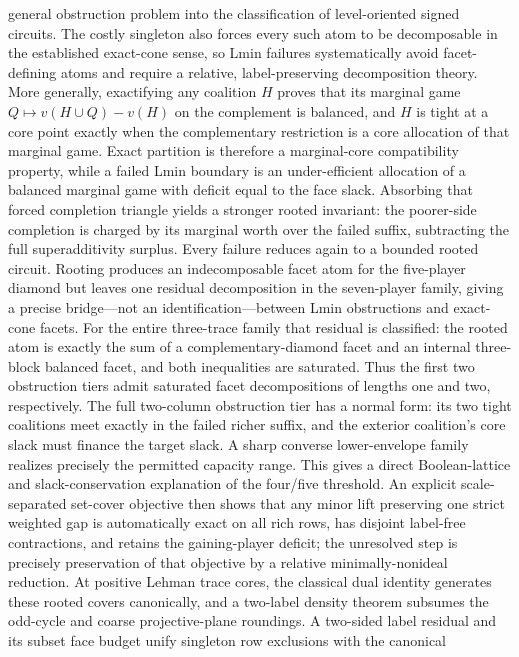 \documentclass[11pt]{article}
\begin{document}
{general obstruction problem into the classification of level-oriented signed
circuits.  The costly singleton also forces every such atom to be decomposable
in the established exact-cone sense, so Lmin failures systematically avoid
facet-defining atoms and require a relative, label-preserving decomposition
theory.
More generally, exactifying any coalition $H$ proves that its marginal game
$Q\mapsto v(H\cup Q)-v(H)$ on the complement is balanced, and $H$ is tight
at a core point exactly when the complementary restriction is a core
allocation of that marginal game.  Exact partition is therefore a
marginal-core compatibility property, while a failed Lmin boundary is an
under-efficient allocation of a balanced marginal game with deficit equal to
the face slack.
Absorbing that forced completion triangle yields a stronger rooted invariant:
the poorer-side completion is charged by its marginal worth over the failed
suffix, subtracting the full superadditivity surplus.  Every failure reduces
again to a bounded rooted circuit.  Rooting produces an indecomposable facet
atom for the five-player diamond but leaves one residual decomposition in the
seven-player family, giving a precise bridge---not an identification---between
Lmin obstructions and exact-cone facets.
For the entire three-trace family that residual is classified: the rooted
atom is exactly the sum of a complementary-diamond facet and an internal
three-block balanced facet, and both inequalities are saturated.  Thus the
first two obstruction tiers admit saturated facet decompositions of lengths
one and two, respectively.
The full two-column obstruction tier has a normal form: its two tight
coalitions meet exactly in the failed richer suffix, and the exterior
coalition's core slack must finance the target slack. A sharp converse
lower-envelope family realizes precisely the permitted capacity range. This
gives a direct Boolean-lattice and slack-conservation explanation of the
four/five threshold.
An explicit scale-separated set-cover objective then shows that any minor
lift preserving one strict weighted gap is automatically exact on all rich
rows, has disjoint label-free contractions, and retains the gaining-player
deficit; the unresolved step is precisely preservation of that objective by
a relative minimally-nonideal reduction.
At positive Lehman trace cores, the classical dual identity generates these
rooted covers canonically, and a two-label density theorem subsumes the
odd-cycle and coarse projective-plane roundings.  A two-sided label residual
and its subset face budget unify singleton row exclusions with the canonical
}
\end{document}
